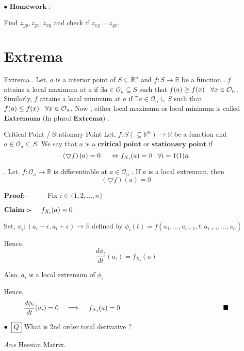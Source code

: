 \documentclass[Analysis-3]{subfiles}
\begin{document}
$\bullet$ $\textbf{Homework :-}$

Find $z_{yy} , z_{yx} , z_{xy}$ and check if $z_{xy} = z_{yx}$.

\section{Extrema}

\begin{Def}{Extrema}
	. Let, $a$ is a interior point of $S \subseteq \mathbb{R}^n$ and $f : S \to \mathbb{R}$ be a function . $f$ attains a local maximum at $a$ if $\exists a \in \mathcal{O}_n \subseteq S$ such that $f(a) \geq f(x) \hspace{3mm} \forall x \in \mathcal{O}_n$. Similarly, $f$ attains a local minimum at $a$ if $\exists a \in \mathcal{O}_n \subseteq S$ such that $f(a) \leq f(x) \hspace{3mm} \forall x \in \mathcal{O}_n$. Now , either local maximum or local minimum is called $\textbf{Extremum}$ (In plural $\textbf{Extrema}$) .   
\end{Def}

\begin{Def}{Critical Point / Stationary Point}
	Let, $f : S (\subseteq \mathbb{R}^n) \to \mathbb{R}$ be a function and $a \in \mathcal{O}_n \subseteq S$. We say that $a$ is a $\textbf{critical point}$ or $\textbf{stationary point}$
	 if \[ \left(\bigtriangledown f\right)(a) = 0 \hspace{5mm} \Leftrightarrow f_{X_i}(a) = 0 \hspace{3mm} \forall i = 1(1)n \]
\end{Def}

\begin{Thm}{}
	. Let, $f: \mathcal{O}_n \to \mathbb{R}$ is differentiable at $a \in \mathcal{O}_n$ . If $a$ is a local extremum, then \[ \left(\bigtriangledown f\right)(a) = 0 \]
\end{Thm}

$\textbf{Proof:-}$ $\hspace{1cm}$ Fix $i \in \{ 1,2, \ldots, n \}$

\begin{clmBox}
	$\textbf{Claim :-} \hspace{5mm} f_{X_i}(a) = 0$ 
\end{clmBox}

Set, $\phi_i : (a_i - \epsilon , a_i + \epsilon) \to \mathbb{R}$ defined by $\phi_i(t) = f(a_1, \ldots,a_{i-1},t, a_{i+1}, \ldots, a_n)$

Hence, \[ \frac{d \phi_i}{dt}(a_i) = f_{X_i}(a) \]

Also, $a_i$ is a local extremum of $\phi_i$

Hence, \[ \frac{d \phi_i}{dt}(a_i) = 0 \hspace{3mm} \implies \hspace{3mm} f_{X_i}(a) = 0 \hspace{5cm} \Qed \]


$\bullet \hspace{2mm} \boxed{Q}$ What is 2nd order total derivative ?

$\boxed{Ans}$ Hessian Matrix.
\end{document}
